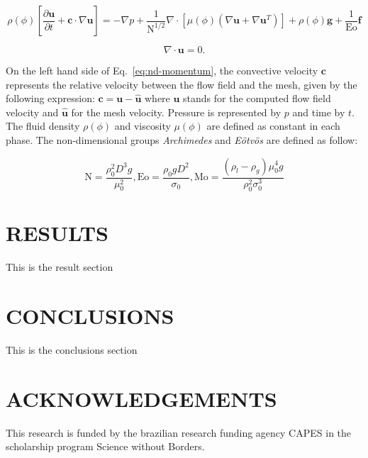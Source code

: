 \documentclass{wccm2014}
\newcommand{\uvet}{\mathbf{u}}
\newcommand{\cvet}{\mathbf{c}}
\newcommand{\Eo}{\mathrm{Eo}}
\newcommand{\N}{\mathrm{N}}
\newcommand{\Mo}{\mathrm{Mo}}
\begin{document}
\begin{equation}
	\rho(\phi) [ \frac{\partial \uvet}{\partial t} 
	+ \cvet \cdot \nabla \uvet ]
	=
	- \nabla p 
	+ \frac{1}{\N^{1/2}} \nabla \cdot
	[\mu(\phi) ( \nabla \uvet + \nabla \uvet^T)]+
	\rho(\phi) \mathbf{g}+
	\frac{1}{\Eo} \mathbf{f}
	\label{eq:nd-momentum}
\end{equation}

\begin{equation}
	\nabla \cdot \uvet
	= 
	0.
\label{eq:nd-continuity} 
\end{equation}

On the left hand side of Eq.~\ref{eq:nd-momentum}, the convective velocity
$\cvet$ represents the relative velocity between the flow field and the
mesh, given by the following expression: $\cvet = \uvet - \hat{\uvet}$
where $\uvet$ stands for the computed flow field velocity and
$\hat{\uvet}$ for the mesh velocity. Pressure is represented by $p$ and
time by $t$. The fluid density $\rho(\phi)$ and viscosity $\mu(\phi)$
are defined as constant in each phase. The non-dimensional groups
\textit{Archimedes} and \textit{E\"otv\"os} are defined as follow:

\begin{equation}
 \N = \frac{\rho_0^2 D^3 g}{\mu_0^2},
 \Eo = \frac{\rho_0 g D^2}{\sigma_0},
 \Mo = \frac{(\rho_l-\rho_g)\mu_0^4 g}{\rho_{0}^2 \sigma_0^3} 
 \label{eq:nd-groups}
\end{equation}


\section{RESULTS}
\label{sec:results}
This is the result section
\section{CONCLUSIONS}
\label{sec:conclusions}
This is the conclusions section
\section{ACKNOWLEDGEMENTS}
\label{sec:acknowledgements}
This research is funded by the brazilian research funding agency CAPES
in the scholarship program Science without Borders.




\end{document}
